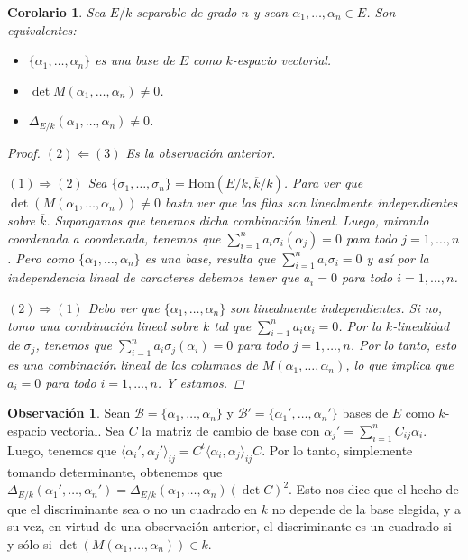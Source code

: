 \documentclass[12pt]{book}
\newtheorem{cor}[teo]{Corolario}
\theoremstyle{definition}
\newtheorem{obs}[teo]{Observación}
\renewcommand{\hom}{\mathrm{Hom}}
\begin{document}
\begin{cor}
Sea $E/k$ separable de grado $n$ y sean $\alpha_1,\ldots , \alpha_n\in E$. Son equivalentes:
\begin{itemize}
\item $\{\alpha_1,\ldots,\alpha_n\}$ es una base de $E$ como $k$-espacio vectorial.
\item $\det M(\alpha_1,\ldots ,\alpha_n)\neq 0$.
\item $\Delta_{E/k}(\alpha_1,\ldots, \alpha_n)\neq 0$.
\end{itemize}
\begin{proof}
$(2)\Longleftarrow(3)$ Es la observación anterior.

$(1)\Longrightarrow (2)$ Sea $\{\sigma_1,\ldots, \sigma_n\} = \hom(E/k,\overline{k}/k)$. Para ver que $\det(M(\alpha_1,\ldots , \alpha_n))\neq 0$ basta ver que las filas son linealmente independientes sobre $\overline{k}$. Supongamos que tenemos dicha combinación lineal. Luego, mirando coordenada a coordenada, tenemos que $\displaystyle\sum_{i=1}^n a_i \sigma_i(\alpha_j)=0$ para todo $j=1,\ldots , n$. Pero como $\{\alpha_1,\ldots , \alpha_n\}$ es una base, resulta que $\displaystyle\sum_{i=1}^n a_i \sigma_i = 0$ y así por la independencia lineal de caracteres debemos tener que $a_i=0$ para todo $i=1,\ldots , n$.

$(2)\Longrightarrow (1)$ Debo ver que $\{\alpha_1,\ldots , \alpha_n\}$ son linealmente independientes. Si no, tomo una combinación lineal sobre $k$ tal que $\displaystyle\sum_{i=1}^n a_i \alpha_i = 0$. Por la $k$-linealidad de $\sigma_j$, tenemos que $\displaystyle\sum_{i=1}^n a_i\sigma_j(\alpha_i)=0$ para todo $j=1,\ldots, n$. Por lo tanto, esto es una combinación lineal de las columnas de $M(\alpha_1,\ldots , \alpha_n)$, lo que implica que $a_i=0$ para todo $i=1,\ldots, n$. Y estamos.
\end{proof}
\end{cor}

\begin{obs}
Sean $\mathscr{B}=\{\alpha_1,\ldots , \alpha_n\}$ y $\mathscr{B}' = \{\alpha_1',\ldots ,\alpha_n'\}$ bases de $E$ como $k$-espacio vectorial. Sea $C$ la matriz de cambio de base con $\alpha_j' = \displaystyle\sum_{i=1}^n C_{ij}\alpha_i$. Luego, tenemos que $\langle \alpha_i',\alpha_j'\rangle_{ij} = C^t \langle \alpha_i,\alpha_j\rangle_{ij} C$. Por lo tanto, simplemente tomando determinante, obtenemos que $\Delta_{E/k}(\alpha_1',\ldots , \alpha_n') = \Delta_{E/k}(\alpha_1,\ldots , \alpha_n) (\det C)^2$. Esto nos dice que el hecho de que el discriminante sea o no un cuadrado en $k$ no depende de la base elegida, y a su vez, en virtud de una observación anterior, el discriminante es un cuadrado si y sólo si $\det(M(\alpha_1,\ldots , \alpha_n)) \in k$.
\end{obs}
\end{document}

